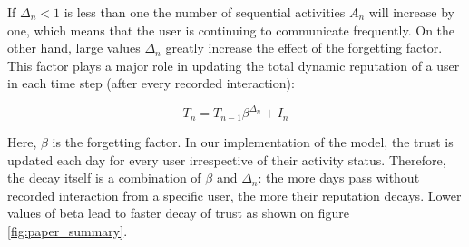 If $\Delta_{n} < 1$ is less than one the number of sequential activities $A_{n}$ will increase by one, which means that the user is continuing to communicate frequently. On the other hand, large values $\Delta_{n}$ greatly increase the effect of the forgetting factor. This factor plays a major role in updating the total dynamic reputation of a user in each time step (after every recorded interaction):

\begin{equation}\label{eq:tn}
T_{n}=T_{n-1} \beta^{\Delta_{n}}+I_{n}
\end{equation}

Here, $\beta$ is the forgetting factor. In our implementation of the model, the trust is updated each day for every user irrespective of their activity status. Therefore, the decay itself is a combination of $\beta$ and $\Delta_n$: the more days pass without recorded interaction from a specific user, the more their reputation decays. Lower values of beta lead to faster decay of trust as shown on figure \ref{fig:paper_summary}.
















